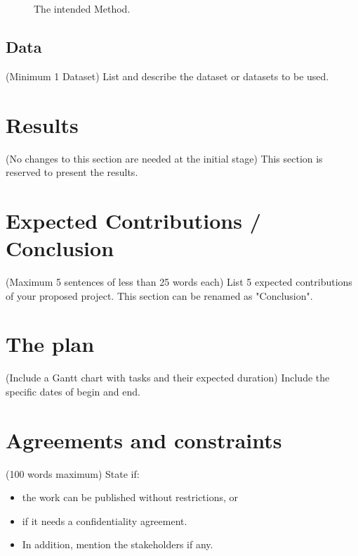 \documentclass[11pt,a4paper]{article}
\begin{document}
\begin{figure}[h]
	\centering
	\caption[The intended Method]{The intended Method. }
	\label{fig:2}
\end{figure}


\subsection{Data}
({\color{blue}Minimum 1 Dataset}) List and describe the dataset or datasets to be used.

\section{Results}

({\color{blue}No changes to this section are needed at the initial stage}) This section is reserved to present the results. 

\section{Expected Contributions / Conclusion}
({\color{blue}Maximum 5 sentences of less than 25 words each}) List 5 expected contributions of your proposed project. This section can be renamed as "Conclusion".

\appendix
\section{The plan}
({\color{blue}Include a Gantt chart with tasks and their expected duration}) Include the specific dates of begin and end.

 
\section{Agreements and constraints}
({\color{blue}100 words maximum}) State if: 

\begin{itemize}
\item the work can be published without restrictions, or 
\item if it needs a confidentiality agreement.
\item In addition, mention the stakeholders if any.
\end{itemize}




\end{document}
